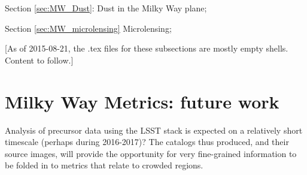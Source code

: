 Section \ref{sec:MW_Dust}: Dust in the Milky Way plane;

Section \ref{sec:MW_microlensing} Microlensing;







[As of 2015-08-21, the .tex files for these subsections are mostly
  empty shells. Content to follow.]







%
%
%
%

\section{Milky Way Metrics: future work}
\def\secname{MW_future_work}\label{sec:\secname}

Analysis of precursor data using the LSST stack is expected on a
relatively short timescale (perhaps during 2016-2017)? The catalogs
thus produced, and their source images, will provide the opportunity
for very fine-grained information to be folded in to metrics that
relate to crowded regions.


\navigationbar




